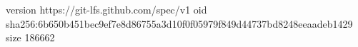 version https://git-lfs.github.com/spec/v1
oid sha256:6b650b451bec9ef7e8d86755a3d10f0f05979f849d44737bd8248eeaadeb1429
size 186662
